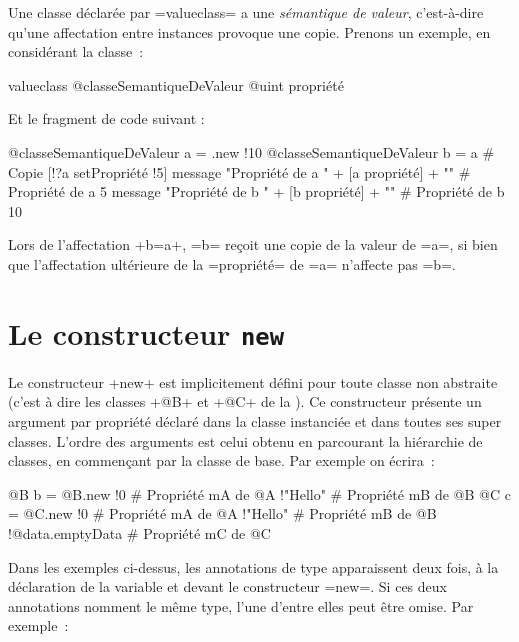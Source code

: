 
Une classe déclarée par \ggs=valueclass= a une \emph{sémantique de valeur}, c'est-à-dire qu'une affectation entre instances provoque une copie. Prenons un exemple, en considérant la classe~:

\begin{galgas}
valueclass @classeSemantiqueDeValeur {
  @uint propriété
}
\end{galgas}

Et le fragment de code suivant :

\begin{galgas}
@classeSemantiqueDeValeur a = .new {!10}
@classeSemantiqueDeValeur b = a # Copie
[!?a setPropriété !5]
message "Propriété de a " + [a propriété] + "\n" # Propriété de a 5
message "Propriété de b " + [b propriété] + "\n" # Propriété de b 10
\end{galgas}

Lors de l'affectation \ggs+b=a+, \ggs=b= reçoit une copie de la valeur de \ggs=a=, si bien que l'affectation ultérieure de la \ggs=propriété= de \ggs=a= n'affecte pas \ggs=b=.








\section{Le constructeur \texttt{new}}

Le constructeur \ggs+new+ est implicitement défini pour toute classe non abstraite (c'est à dire les classes \ggs+@B+ et \ggs+@C+ de la ). Ce constructeur présente un argument par propriété déclaré dans la classe instanciée et dans toutes ses super classes. L'ordre des arguments est celui obtenu en parcourant la hiérarchie de classes, en commençant par la classe de base. Par exemple on écrira~:

\begin{galgas}
@B b = @B.new {
  !0 # Propriété mA de @A
  !"Hello" # Propriété mB de @B
}
@C c = @C.new {
  !0 # Propriété mA de @A
  !"Hello" # Propriété mB de @B
  !@data.emptyData # Propriété mC de @C
}
\end{galgas}

Dans les exemples ci-dessus, les annotations de type apparaissent deux fois, à la déclaration de la variable et devant le constructeur \ggs=new=. Si ces deux annotations nomment le même type, l'une d'entre elles peut être omise. Par exemple~:

